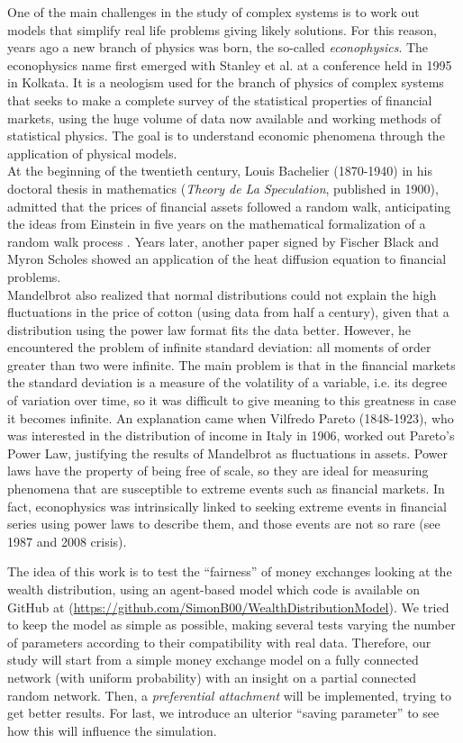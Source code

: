 One of the main challenges in the study of complex systems is to work out models that simplify real life problems giving likely solutions.
For this reason, years ago a new branch of physics was born, the so-called \emph{econophysics}.
The econophysics name first emerged with Stanley et al. at a conference held in 1995 in Kolkata.
It is a neologism used for the branch of physics of complex systems that seeks to make a complete survey of the statistical properties of financial markets, using the huge volume of data now available and working methods of statistical physics.
The goal is to understand economic phenomena through the application of physical models. \\
At the beginning of the twentieth century, Louis Bachelier (1870-1940) in his doctoral thesis in mathematics (\emph{Theory de La Speculation}, published in 1900), admitted that the prices of financial assets followed a random walk, anticipating the ideas from Einstein in five years on the mathematical formalization of a random walk process \cite{history}.
Years later, another paper signed by Fischer Black and Myron Scholes showed an application of the heat diffusion equation to financial problems. \\
Mandelbrot \cite{mandelbrot1965} also realized that normal distributions could not explain the high fluctuations in the price of cotton (using data from half a century), given that a distribution using the power law format fits the data better.  
However, he encountered the problem of infinite standard deviation: all moments of order greater than two were infinite.
The main problem is that in the financial markets the standard deviation is a measure of the volatility of a variable, i.e. its degree of variation over time, so it was difficult to give meaning to this greatness in case it becomes infinite.
An explanation came when Vilfredo Pareto (1848-1923), who was interested in the distribution of income in Italy in 1906, worked out Pareto's Power Law, justifying the results of Mandelbrot as fluctuations in assets.
Power laws have the property of being free of scale, so they are ideal for measuring phenomena that are susceptible to extreme events such as financial markets.
In fact, econophysics was intrinsically linked to seeking extreme events in financial series using power laws to describe them, and those events are not so rare (see 1987 and 2008 crisis).

The idea of this work is to test the ``fairness'' of money exchanges looking at the wealth distribution, using an agent-based model which code is available on GitHub at (\url{https://github.com/SimonB00/WealthDistributionModel}).
We tried to keep the model as simple as possible, making several tests varying the number of parameters according to their compatibility with real data.
Therefore, our study will start from a simple money exchange model on a fully connected network (with uniform probability) with an insight on a partial connected random network.
Then, a \emph{preferential attachment} will be implemented, trying to get better results.
For last, we introduce an ulterior ``saving parameter'' to see how this will influence the simulation.
